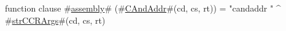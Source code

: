function clause #\hyperref[sailMIPSzassembly]{assembly}# (#\hyperref[sailMIPSzCAndAddr]{CAndAddr}#(cd, cs, rt)) = "candaddr " ^ #\hyperref[sailMIPSzstrCCRArgs]{strCCRArgs}#(cd, cs, rt)
